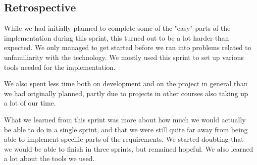 \subsection{Retrospective}
While we had initially planned to complete some of the "easy" parts of the implementation during this sprint, this turned out to be a lot harder than expected. We only managed to get started before we ran into problems related to unfamiliarity with the technology. We mostly used this sprint to set up various tools needed for the implementation.

We also spent less time both on development and on the project in general than we had originally planned, partly due to projects in other courses also taking up a lot of our time.

What we learned from this sprint was more about how much we would actually be able to do in a single sprint, and that we were still quite far away from being able to implement specific parts of the requirements. We started doubting that we would be able to finish in three sprints, but remained hopeful. We also learned a lot about the tools we used.
